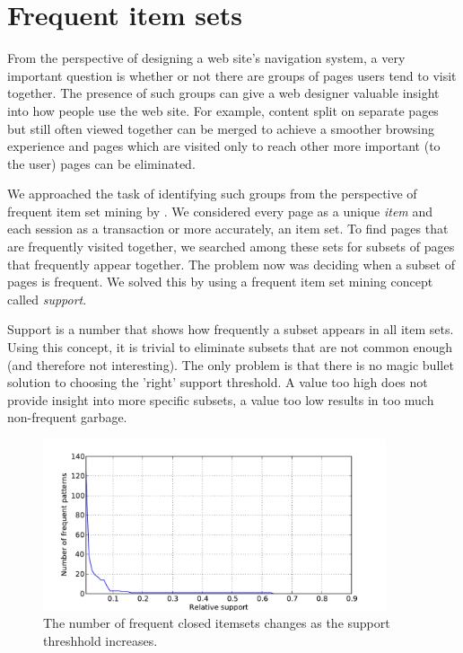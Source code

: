 \documentclass[12pt, english,a4paper]{article}
\begin{document}
\section{Frequent item sets} 
From the perspective of designing a web site's navigation system, a very important question is whether or not there are groups of pages users tend to visit together. The presence of such groups can give a web designer valuable insight into how people use the web site. For example, content split on separate pages but still often viewed together can be merged to achieve a smoother browsing experience and pages which are visited only to reach other more important (to the user) pages can be eliminated.

We approached the task of identifying such groups from the perspective of frequent item set mining by \cite{frequent_item_set_mining}. We considered every page as a unique \emph{item} and each session as a transaction or more accurately, an item set. To find pages that are frequently visited together, we searched among these sets for subsets of pages that frequently appear together. The problem now was deciding when a subset of pages is frequent. We solved this by using a frequent item set mining concept called \emph{support}.

Support is a number that shows how frequently a subset appears in all item sets. Using this concept, it is trivial to eliminate subsets that are not common enough (and therefore not interesting). The only problem is that there is no magic bullet solution to choosing the 'right' support threshold. A value too high does not provide insight into more specific subsets, a value too low results in too much non-frequent garbage.
\begin{figure}[H]
  \centering
      \includegraphics[width=0.9\textwidth]{apriori_closed_itemset_count}
  \caption{ The number of frequent closed itemsets changes as the support threshhold increases. }
\end{figure}
\end{document}
